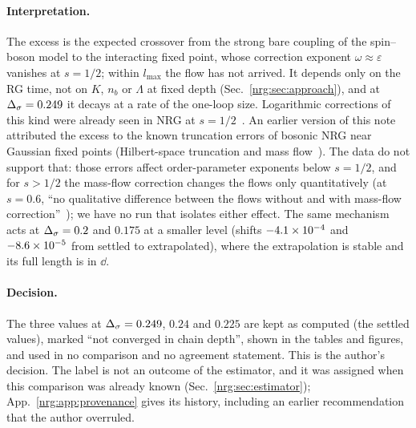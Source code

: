 \paragraph{Interpretation.} The excess is the expected crossover from the strong bare coupling of the spin--boson model to the
interacting fixed point, whose correction exponent $\omega\approx\varepsilon$ vanishes at $s=1/2$; within $l_{\max}$ the flow has not
arrived. It depends only on the RG time, not on $K$, $n_b$ or $\Lambda$ at fixed depth (Sec.~\ref{nrg:sec:approach}), and at
$\Ds=0.249$ it decays at a rate of the one-loop size. Logarithmic corrections of this kind were already seen in NRG at $s=1/2$~\cite{nrg:Vojta2005}.
An earlier version of this note attributed the excess to the known truncation errors of bosonic NRG near Gaussian fixed points
(Hilbert-space truncation and mass flow~\cite{nrg:Vojta2005,nrg:Vojta2010,nrg:Vojta2012}). The data do not support that: those errors affect
order-parameter exponents below $s=1/2$, and for $s>1/2$ the mass-flow correction changes the flows only quantitatively
(at $s=0.6$, ``no qualitative difference between the flows without and with mass-flow correction''~\cite{nrg:Vojta2010}); we have no run
that isolates either effect. The same mechanism acts at $\Ds=0.2$ and $0.175$ at a smaller level (shifts $-4.1\times10^{-4}$ and
$-8.6\times10^{-5}$ from settled to extrapolated), where the extrapolation is stable and its full length is in $\dd$.

\paragraph{Decision.} The three values at $\Ds=0.249$, $0.24$ and $0.225$ are kept as computed (the settled values), marked ``not
converged in chain depth'', shown in the tables and figures, and used in no comparison and no agreement statement. This is the
author's decision. The label is not an outcome of the estimator, and it was assigned when this comparison was already known
(Sec.~\ref{nrg:sec:estimator}); App.~\ref{nrg:app:provenance} gives its history, including an earlier recommendation that the author
overruled.

\begin{table}[ht]\centering\scriptsize\setlength{\tabcolsep}{3pt}
\caption{NRG against the $\varepsilon$ series near $s=1/2$. Optimal truncation with its smallest term; Borel--Pad\'e central value with
the spread over approximants; NRG minus the reference (the partial sum at $\Ds=0.249$, the Borel--Pad\'e sum otherwise; at $\Ds=0.2$
this difference is not meaningful, see text); the range of the rule's extrapolations and the crossover fit of
Sec.~\ref{nrg:sec:crosscheck} (cross-checks, not adopted). Bracketed: settled values not converged in chain depth, not used.}\label{nrg:tab:series}

\end{table}

